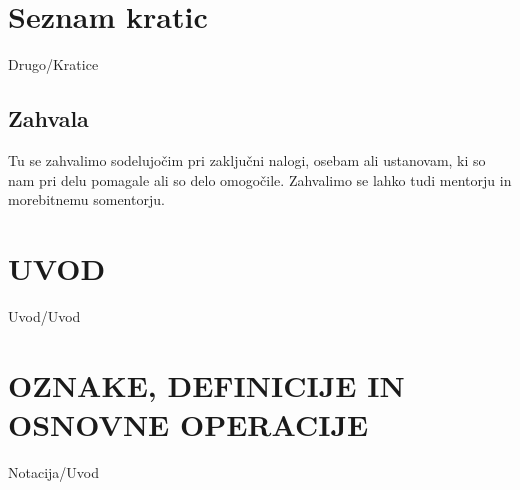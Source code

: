 \documentclass[12pt,a4paper,titlepage,openany,twoside]{report}
\begin{document}
\newpage

\tableofcontents
{}
\newpage
\listoftables
{}
\newpage
\listoffigures
{}
\newpage

\chapter*{Seznam kratic}
\thispagestyle{fancyplain}
{Drugo/Kratice}
\newpage

\normalsize



\newpage
\section*{\textbf{Zahvala}}


Tu se zahvalimo sodelujočim pri zaključni nalogi, osebam ali ustanovam, ki so nam pri delu pomagale ali so delo omogočile. Zahvalimo se lahko tudi mentorju in morebitnemu somentorju.


% 
% 

\chapter{UVOD}\label{sec:uvod}
\thispagestyle{fancy} %

{Uvod/Uvod}

\chapter{OZNAKE, DEFINICIJE IN OSNOVNE OPERACIJE}\label{sec:Notacija}
\thispagestyle{fancy} 
{Notacija/Uvod}
\end{document}

